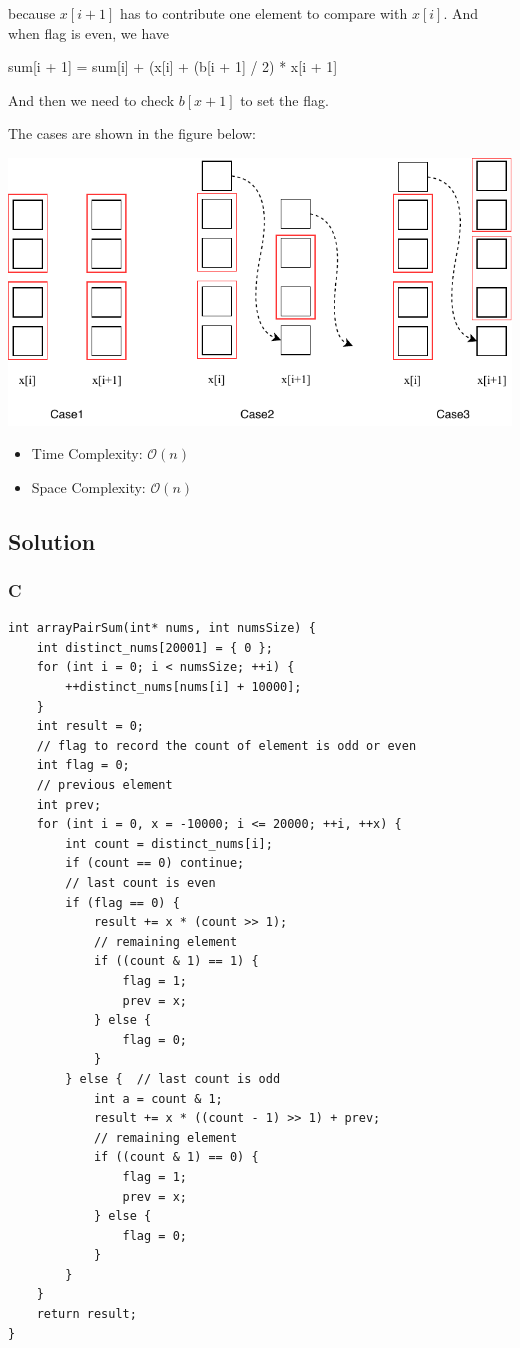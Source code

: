 because $x[i + 1]$ has to contribute one element to compare with $x[i]$. And when flag is even, we have
\begin{multilinecode}
sum[i + 1] = sum[i] + (x[i] + (b[i + 1] / 2) * x[i + 1]
\end{multilinecode}
And then we need to check $b[x + 1]$ to set the flag.

The cases are shown in the figure below:

\includegraphics{figs/algo_561_1}

\begin{itemize}
    \item Time Complexity: $\mathcal{O}(n)$
    \item Space Complexity: $\mathcal{O}(n)$
\end{itemize}

\subsection*{Solution}
\subsubsection*{C}
\begin{verbatim}
int arrayPairSum(int* nums, int numsSize) {
    int distinct_nums[20001] = { 0 };
    for (int i = 0; i < numsSize; ++i) {
        ++distinct_nums[nums[i] + 10000];
    }
    int result = 0;
    // flag to record the count of element is odd or even
    int flag = 0;
    // previous element
    int prev;
    for (int i = 0, x = -10000; i <= 20000; ++i, ++x) {
        int count = distinct_nums[i];
        if (count == 0) continue;
        // last count is even
        if (flag == 0) {
            result += x * (count >> 1);
            // remaining element
            if ((count & 1) == 1) {
                flag = 1;
                prev = x;
            } else {
                flag = 0;
            }
        } else {  // last count is odd
            int a = count & 1;
            result += x * ((count - 1) >> 1) + prev;
            // remaining element
            if ((count & 1) == 0) {
                flag = 1;
                prev = x;
            } else {
                flag = 0;
            }
        }
    }
    return result;
}
\end{verbatim}

\newpage
